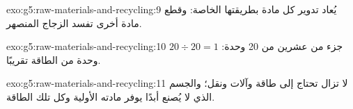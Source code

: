 \begin{solution}{exo:g5:raw-materials-and-recycling:9}
يُعاد تدوير كل مادة بطريقتها الخاصة: وقطع مادة أخرى تفسد الزجاج
المنصهر.
\end{solution}

\begin{solution}{exo:g5:raw-materials-and-recycling:10}
جزء من عشرين من 20 وحدة: $20 \div 20 = 1$ وحدة من الطاقة تقريبًا.
\end{solution}

\begin{solution}{exo:g5:raw-materials-and-recycling:11}
 لا تزال تحتاج إلى طاقة وآلات ونقل؛ والجسم الذي لا يُصنع أبدًا
يوفر مادته الأولية وكل تلك الطاقة.
\end{solution}
